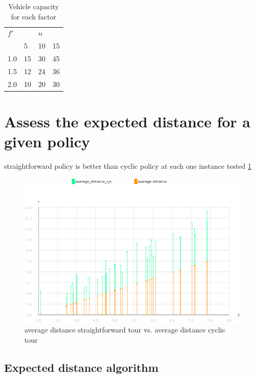 \begin{table}
  \centering
  \caption{Vehicle capacity for each factor}\label{tb:Q}
\begin{tabular}{l l l l}
  \hline
  $f'$ &   & $n$ &   \\
  \cline{2-4}
      & 5 & 10 & 15 \\
  \hline
  1.0 & 15 & 30 & 45 \\
  1.5 & 12 & 24 & 36 \\
  2.0 & 10 & 20 & 30 \\
  \hline
\end{tabular}
\end{table}

\section{Assess the expected distance for a given policy}

straightforward policy is better than cyclic policy at each one instance tested \ref{fig:avg_distance_cyclic_vs_avg_distance_forward}

\begin{figure}[!htbp]
  \begin{center}
   \includegraphics[width=1\textwidth]{Images/Chapter5/cyclic_vs_straightforward_avgdistance_n5_n8.eps}
  \end{center}
    \caption{average distance straightforward tour vs. average distance cyclic tour}\label{fig:avg_distance_cyclic_vs_avg_distance_forward}
\end{figure}

\subsection{Expected distance algorithm}\label{sec:test_expecteddistance}

